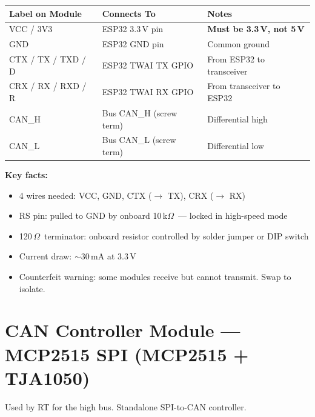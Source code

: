 \documentclass[12pt,a4paper,oneside]{report}
\begin{document}
\begin{center}
\begin{tabular}{lll}
\toprule
\textbf{Label on Module} & \textbf{Connects To} & \textbf{Notes} \\
\midrule
VCC / 3V3         & ESP32 3.3\,V pin     & \textbf{Must be 3.3\,V, not 5\,V} \\
GND               & ESP32 GND pin        & Common ground \\
CTX / TX / TXD / D & ESP32 TWAI TX GPIO   & From ESP32 to transceiver \\
CRX / RX / RXD / R & ESP32 TWAI RX GPIO   & From transceiver to ESP32 \\
CAN\_H             & Bus CAN\_H (screw term) & Differential high \\
CAN\_L             & Bus CAN\_L (screw term) & Differential low \\
\bottomrule
\end{tabular}
\end{center}

\textbf{Key facts:}
\begin{itemize}[leftmargin=*,nosep]
  \item 4 wires needed: VCC, GND, CTX ($\rightarrow$ TX), CRX ($\rightarrow$ RX)
  \item RS pin: pulled to GND by onboard 10\,k$\Omega$\ --- locked in high-speed mode
  \item 120\,$\Omega$\ terminator: onboard resistor controlled by solder jumper or DIP switch
  \item Current draw: $\sim$30\,mA at 3.3\,V
  \item Counterfeit warning: some modules receive but cannot transmit. Swap to isolate.
\end{itemize}

\section{CAN Controller Module --- MCP2515 SPI (MCP2515 + TJA1050)}

Used by RT for the high bus. Standalone SPI-to-CAN controller.
\end{document}
